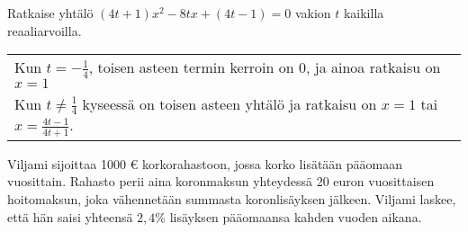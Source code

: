 \begin{tehtavasivu}
\begin{tehtava}
Ratkaise yhtälö $(4t+1)x^2-8tx+(4t-1)=0$ vakion $t$ kaikilla reaaliarvoilla.
	\begin{vastaus} \begin{tabular}{l}
		Kun $t=-\frac{1}{4}$, toisen asteen termin kerroin on $0$, ja ainoa ratkaisu on
	 $x = 1$  \\
		Kun $t \neq \frac{1}{4}$ kyseessä on toisen asteen yhtälö ja ratkaisu on $x= 1$ tai $x=\frac{4t-1}{4t+1}$. 	
		\end{tabular}
    \end{vastaus}
\end{tehtava}


\begin{tehtava}
	Viljami sijoittaa 1000 € korkorahastoon, jossa korko lisätään pääomaan vuosittain. Rahasto perii aina koronmaksun yhteydessä
	20 euron vuosittaisen hoitomaksun, joka vähennetään summasta koronlisäyksen jälkeen. Viljami laskee, että hän saisi yhteensä $2,4\%$ lisäyksen
	pääomaansa kahden vuoden aikana.
        \begin{alakohdat}
        \end{alakohdat}
	\begin{vastaus}
	    \begin{alakohdat}
	    \end{alakohdat}
	\end{vastaus}
\end{tehtava}


\end{tehtavasivu}
